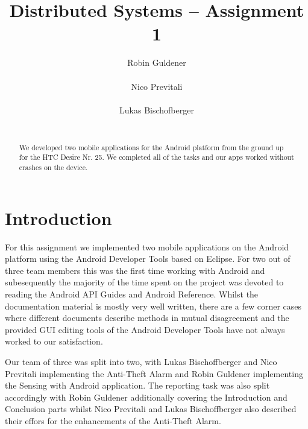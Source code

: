 \documentclass{report}
\title{Distributed Systems -- Assignment 1}
\author{
%
%
\alignauthor Robin Guldener\\
	\affaddr{ETH ID 11-930-369}\\
	\email{robing@student.ethz.ch}
\alignauthor Nico Previtali\\
	\affaddr{ETH ID XX-XXX-XXX}\\
	\email{two@student.ethz.ch}
\alignauthor Lukas Bischofberger\\
	\affaddr{ETH ID 11-915-907}\\
	\email{lukasbi@student.ethz.ch}
}
\begin{document}
\maketitle

\begin{abstract}

We developed two mobile applications for the Android platform from the ground up for the HTC Desire Nr. 25. We completed all of the tasks and our apps worked without crashes on the device.
\end{abstract}

\section{Introduction}

For this assignment we implemented two mobile applications on the Android platform using the Android Developer Tools based on Eclipse\cite{androidDevTools}. For two out of three team members this was the first time working with Android and subesequently the majority of the time spent on the project was devoted to reading the Android API Guides\cite{androidAPIGuides} and Android Reference\cite{androidAPIReference}. Whilst the documentation material is mostly very well written, there are a few corner cases where different documents describe methods in mutual disagreement and the provided GUI editing tools of the Android Developer Tools have not always worked to our satisfaction.

Our team of three was split into two, with Lukas Bischoffberger and Nico Previtali implementing the Anti-Theft Alarm and Robin Guldener implementing the Sensing with Android application. The reporting task was also split accordingly with Robin Guldener additionally covering the Introduction and Conclusion parts whilst Nico Previtali and Lukas Bischoffberger also described their effors for the enhancements of the Anti-Theft Alarm.

\end{document}

